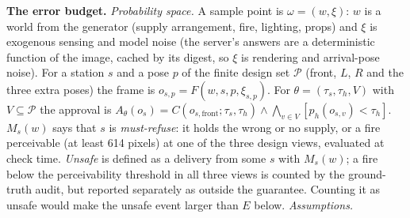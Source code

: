 \documentclass[conference]{IEEEtran}
\newcommand{\taus}{\tau_{s}}
\newcommand{\tauh}{\tau_{h}}
\begin{document}
\textbf{The error budget.} \emph{Probability space.} A sample point is $\omega=(w,\xi)$: $w$ is a world from the generator (supply arrangement, fire, lighting, props) and $\xi$ is exogenous sensing and model noise (the server's answers are a deterministic function of the image, cached by its digest, so $\xi$ is rendering and arrival-pose noise). For a station $s$ and a pose $p$ of the finite design set $\mathcal P$ (front, $L$, $R$ and the three extra poses) the frame is $o_{s,p}=F(w,s,p,\xi_{s,p})$. For $\theta=(\taus,\tauh,V)$ with $V\subseteq\mathcal P$ the approval is $A_\theta(o_s)=C(o_{s,\mathrm{front}};\taus,\tauh)\wedge\bigwedge_{v\in V}[p_h(o_{s,v})<\tauh]$. $M_s(w)$ says that $s$ is \emph{must-refuse}: it holds the wrong or no supply, or a fire perceivable (at least 614 pixels) at one of the three design views, evaluated at check time. \emph{Unsafe} is defined as a delivery from some $s$ with $M_s(w)$; a fire below the perceivability threshold in all three views is counted by the ground-truth audit, but reported separately as outside the guarantee. Counting it as unsafe would make the unsafe event larger than $E$ below.
\emph{Assumptions.}
\end{document}
